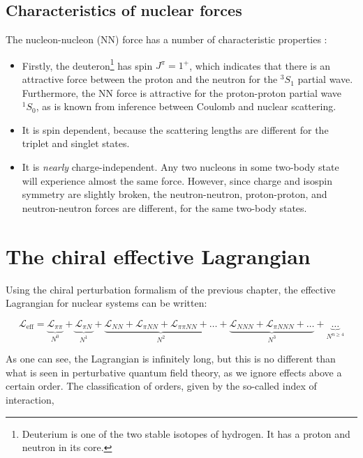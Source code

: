 \documentclass[10pt,twoside]{report}
\begin{document}
	\subsection{Characteristics of nuclear forces}
	The nucleon-nucleon (NN) force has a number of characteristic properties \cite{phy981}:
	
	\begin{itemize}
		\item Firstly, the deuteron\footnote{Deuterium is one of the two stable isotopes of hydrogen. It has a proton and neutron in its core.} has spin $J^\pi = 1^+$, which indicates that there is an attractive force between the proton and the neutron for the $^3S_1$ partial wave. Furthermore, the NN force is attractive for the proton-proton partial wave $^1S_0$, as is known from inference between Coulomb and nuclear scattering. \\
		\item It is spin dependent, because the scattering lengths are different for the triplet and singlet states.\\
		\item It is \emph{nearly} charge-independent. Any two nucleons in some two-body state will experience almost the same force. However, since charge and isospin symmetry are slightly broken, the neutron-neutron, proton-proton, and neutron-neutron forces are different, for the same two-body states.
	\end{itemize} 
	
	\section{The chiral effective Lagrangian}
	Using the chiral perturbation formalism of the previous chapter, the effective Lagrangian for nuclear systems can be written:
	
	\begin{equation}
		\mathcal{L}_{\text{eff}} = \underbrace{\mathcal{L}_{\pi\pi}}_{N^0} + \underbrace{\mathcal{L}_{\pi N}}_{N^1} + \underbrace{\mathcal{L}_{NN} + \mathcal{L}_{\pi NN} + \mathcal{L}_{\pi\pi NN} + \ldots}_{N^2} + \underbrace{\mathcal{L}_{NNN} + \mathcal{\mathcal{L}}_{\pi NNN} + \ldots}_{N^3} + \underbrace{\ldots}_{N^{n\geq 4}}
	\end{equation}
	
	As one can see, the Lagrangian is infinitely long, but this is no different than what is seen in perturbative quantum field theory, as we ignore effects above a certain order. The classification of orders, given by the so-called index of interaction,
	
\end{document}
